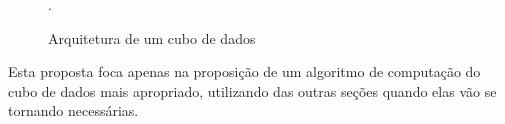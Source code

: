 \begin{figure}[ht]
	\caption{Arquitetura de um cubo de dados}
	\vspace{6mm}
	\begin{center}
	\end{center}
	\vspace{2mm}
	\legenda{}
	\FONTE{}.
	\label{fig:cubearch}
\end{figure}

Esta proposta foca apenas na proposição de um algoritmo de computação do cubo de dados mais apropriado, utilizando das outras seções quando elas vão se tornando necessárias.

